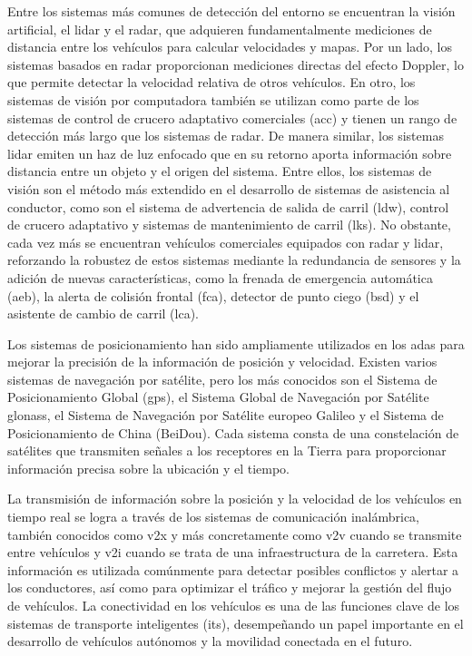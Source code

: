 Entre los sistemas más comunes de detección del entorno se encuentran la visión artificial, el \gls{lidar} y el radar, que adquieren fundamentalmente mediciones de distancia entre los vehículos para calcular velocidades y mapas. Por un lado, los sistemas basados en radar proporcionan mediciones directas del efecto Doppler, lo que permite detectar la velocidad relativa de otros vehículos. En otro, los sistemas de visión por computadora también se utilizan como parte de los sistemas de control de crucero adaptativo comerciales (\gls{acc}) y tienen un rango de detección más largo que los sistemas de radar. De manera similar, los sistemas \gls{lidar} emiten un haz de luz enfocado que en su retorno aporta información sobre distancia entre un objeto y el origen del sistema. Entre ellos, los sistemas de visión son el método más extendido en el desarrollo de sistemas de asistencia al conductor, como son el sistema de advertencia de salida de carril (\gls{ldw}), control de crucero adaptativo y sistemas de mantenimiento de carril (\gls{lks}). No obstante, cada vez más se encuentran vehículos comerciales equipados con radar y \gls{lidar}, reforzando la robustez de estos sistemas mediante la redundancia de sensores y la adición de nuevas características, como la frenada de emergencia automática (\gls{aeb}), la alerta de colisión frontal (\gls{fca}), detector de punto ciego (\gls{bsd}) y el asistente de cambio de carril (\gls{lca}).

Los sistemas de posicionamiento han sido ampliamente utilizados en los \gls{adas} para mejorar la precisión de la información de posición y velocidad. Existen varios sistemas de navegación por satélite, pero los más conocidos son el Sistema de Posicionamiento Global (\gls{gps}), el Sistema Global de Navegación por Satélite \gls{glonass}, el Sistema de Navegación por Satélite europeo Galileo y el Sistema de Posicionamiento de China (BeiDou). Cada sistema consta de una constelación de satélites que transmiten señales a los receptores en la Tierra para proporcionar información precisa sobre la ubicación y el tiempo. 

La transmisión de información sobre la posición y la velocidad de los vehículos en tiempo real se logra a través de los sistemas de comunicación inalámbrica, también conocidos como \gls{v2x} y más concretamente como \gls{v2v} cuando se transmite entre vehículos y \gls{v2i} cuando se trata de una infraestructura de la carretera. Esta información es utilizada comúnmente para detectar posibles conflictos y alertar a los conductores, así como para optimizar el tráfico y mejorar la gestión del flujo de vehículos. La conectividad en los vehículos es una de las funciones clave de los sistemas de transporte inteligentes (\gls{its}), desempeñando un papel importante en el desarrollo de vehículos autónomos y la movilidad conectada en el futuro.

